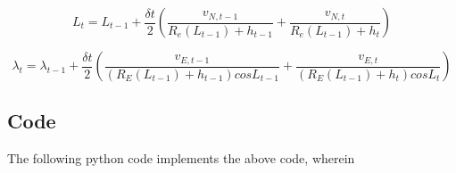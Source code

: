 \documentclass{article}
\begin{document}
\begin{equation}
    L_t = L_{t-1} + \frac{\delta t}{2} (\frac{v_{N,t-1}}{R_e(L_{t-1}) + h_{t-1}} + \frac{v_{N,t}}{R_e(L_{t-1}) + h_t})
\end{equation}

\begin{equation}
    \lambda_t = \lambda_{t-1} + \frac{\delta t}{2} (\frac{v_{E,t-1}}{(R_E(L_{t-1}) + h_{t-1})cos L_{t-1}} + \frac{v_{E,t}}{(R_E(L_{t-1}) + h_t)cos L_t})
\end{equation}

\subsection*{Code}

The following python code implements the above code, wherein
\end{document}

